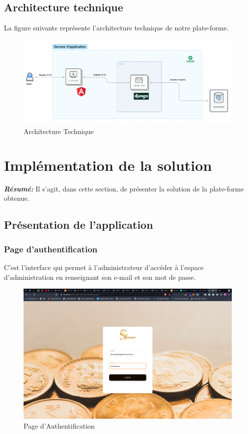 \documentclass[a4paper, 12pt]{report}
\begin{document}
\section{Architecture technique}
La figure suivante représente l'architecture technique de notre plate-forme.
\begin{figure}[H]
    \centering
    \includegraphics[width = 1\linewidth]{img/architecture_technique.png}
    \caption{Architecture Technique}
\end{figure}

\chapter{Implémentation de la solution}

\textit{\textbf{Résumé:} }
Il s'agit, dans cette section, de présenter la solution de la plate-forme obtenue.
\minitoc
\newpage
\section{Présentation de l'application}
\subsection{Page d'authentification}
C'est l'interface qui permet à l'administrateur d'accéder à l'espace d'administration en renseignant son e-mail et son mot de passe.
\begin{figure}[H]
    \centering
    \includegraphics[width = 1\linewidth]{img/login.png}
    \caption{Page d'Authentification}
\end{figure}
\end{document}
